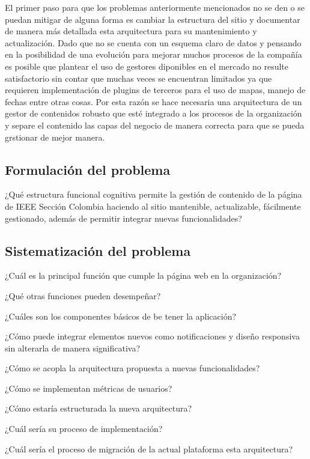El primer paso para que los problemas anteriormente mencionados no se den o se puedan mitigar de alguna forma es cambiar la estructura del sitio y documentar de manera más detallada esta arquitectura para su mantenimiento y actualización. Dado que no se cuenta con un esquema claro de datos y pensando en la posibilidad de una evolución para mejorar muchos procesos de la compañía es posible que plantear el uso de gestores diponibles en el mercado no resulte satisfactorio sin contar que muchas veces se encuentran limitados ya que requieren implementación de plugins de terceros para el uso de mapas, manejo de fechas entre otras cosas. Por esta razón se hace necesaria una arquitectura de un gestor de contenidos robusto que esté integrado a los procesos de la organización y separe el contenido las capas del negocio de manera correcta para que se pueda grstionar de mejor manera.


\subsection{Formulación del problema}

¿Qué estructura funcional cognitiva permite la gestión de contenido de la página de IEEE Sección Colombia haciendo al sitio mantenible, actualizable, fácilmente gestionado, además de permitir integrar nuevas funcionalidades?

\subsection{Sistematización del problema}

¿Cuál es la principal función que cumple la página web en la organización?

¿Qué otras funciones pueden desempeñar?

¿Cuáles son los componentes básicos de be tener la aplicación?

¿Cómo puede integrar elementos nuevos como notificaciones y diseño responsiva sin alterarla de manera significativa?

¿Cómo se acopla la arquitectura propuesta a nuevas funcionalidades?

¿Cómo se implementan métricas de usuarios?

¿Cómo estaría estructurada la nueva arquitectura?

¿Cuál sería su proceso de implementación?

¿Cuál sería el proceso de migración de la actual plataforma esta arquitectura?


